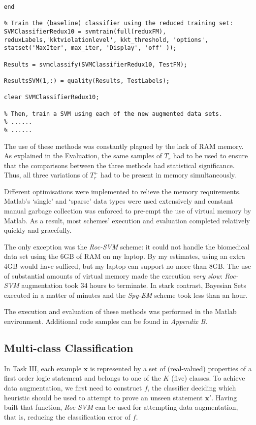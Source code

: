 \documentclass[12pt,twoside,notitlepage,amsart]{report} %
\begin{document}
\begin{lstlisting}
end

% Train the (baseline) classifier using the reduced training set:
SVMClassifierRedux10 = svmtrain(full(reduxFM), reduxLabels,'kktviolationlevel', kkt_threshold, 'options', statset('MaxIter', max_iter, 'Display', 'off' ));

Results = svmclassify(SVMClassifierRedux10, TestFM);

ResultsSVM(1,:) = quality(Results, TestLabels);

clear SVMClassifierRedux10; 

% Then, train a SVM using each of the new augmented data sets.
% ......
% ......
\end{lstlisting}
	
	The use of these methods was constantly plagued by the lack of RAM memory. As explained in the Evaluation, the same samples of $T_r$ had to be used to ensure that the comparisons between the three methods had statistical significance. Thus, all three variations of $T_r^{+}$ had to be present in memory simultaneously. 

Different optimisations were implemented to relieve the memory requirements. Matlab's `single' and `sparse' data types were used extensively and constant manual garbage collection was enforced to pre-empt the use of virtual memory by Matlab. As a result, most schemes' execution and evaluation completed relatively quickly and gracefully.

The only exception was the \emph{Roc-SVM} scheme: it could not handle the biomedical data set using the 6GB of RAM on my laptop. By my estimates, using an extra 4GB would have sufficed, but my laptop can support no more than 8GB. The use of substantial amounts of virtual memory made the execution \emph{very slow}: \emph{Roc-SVM} augmentation took 34 hours to terminate. In stark contrast, Bayesian Sets executed in a matter of minutes and the \emph{Spy-EM} scheme took less than an hour. 

The execution and evaluation of these methods was performed in the Matlab environment. Additional code samples can be found in \emph{Appendix B}. 
 

	\subsection{Multi-class Classification} %
	
	In Task III, each example $\mathbf{x}$ is represented by a set of (real-valued) properties of a first order logic statement and belongs to one of the $K$ ({five}) classes. To achieve data augmentation, we first need to construct $f$, the classifier deciding which heuristic should be used to attempt to prove an unseen statement $\mathbf{x'}$. Having built that function, \emph{Roc-SVM} can be used for attempting data augmentation, that is, reducing the classification error of $f$. 
	
\end{document}

